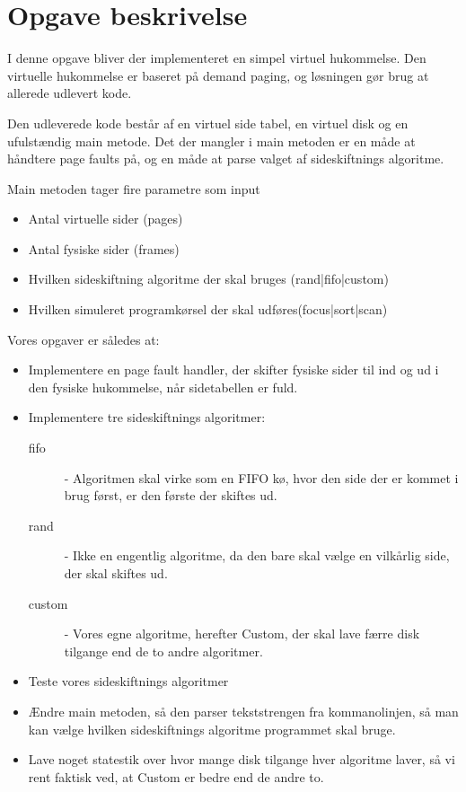 \section{Opgave beskrivelse}

I denne opgave bliver der implementeret en simpel virtuel hukommelse. Den virtuelle hukommelse er baseret på demand paging, og løsningen gør brug at allerede udlevert kode.

Den udleverede kode består af en virtuel side tabel, en virtuel disk og en ufulstændig main metode. Det der mangler i main metoden er en måde at håndtere page faults på, og en måde at parse valget af sideskiftnings algoritme.

Main metoden tager fire parametre som input

\begin{itemize}
\item Antal virtuelle sider (pages)
\item Antal fysiske sider (frames)
\item Hvilken sideskiftning algoritme der skal bruges (rand|fifo|custom)
\item Hvilken simuleret programkørsel der skal udføres(focus|sort|scan)
\end{itemize} 

Vores opgaver er således at:

\begin{itemize}
\item Implementere en page fault handler, der skifter fysiske sider til ind og ud i den fysiske hukommelse, når sidetabellen er fuld.

\item Implementere tre sideskiftnings algoritmer: 

\begin{description}
\item[fifo] - Algoritmen skal virke som en FIFO kø, hvor den side der er kommet i brug først, er den første der skiftes ud. 
\item[rand] - Ikke en engentlig algoritme, da den bare skal vælge en vilkårlig side, der skal skiftes ud.
\item[custom] - Vores egne algoritme, herefter Custom, der skal lave færre disk tilgange end de to andre algoritmer.
\end{description}

\item Teste vores sideskiftnings algoritmer

\item Ændre main metoden, så den parser tekststrengen fra kommanolinjen, så man kan vælge hvilken sideskiftnings algoritme programmet skal bruge.

\item Lave noget statestik over hvor mange disk tilgange hver algoritme laver, så vi rent faktisk ved, at Custom er bedre end de andre to.
\end{itemize}